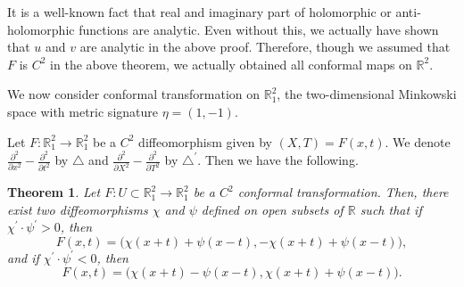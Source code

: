 \documentclass[a4paper,10pt]{amsart}
\theoremstyle{plain}
\newtheorem{thm}{Theorem}[section]
\newtheorem*{main theorem}{Theorem}
\theoremstyle{definition}
\begin{document}
It is a well-known fact that real and imaginary part of
holomorphic or anti-holomorphic functions are analytic. Even
without this, we actually have shown that $u$ and $v$ are analytic
in the above proof. Therefore, though we assumed that $F$ is $C^2$
in the above theorem, we actually obtained all conformal maps on
$\mathbb{R}^2$.

We now consider conformal transformation on $\mathbb{R}^2_1$, the
two-dimensional Minkowski space with metric signature $\eta = (1,
-1)$.

Let $F : \mathbb{R}^2_1 \rightarrow \mathbb{R}^2_1$ be a $C^2$
diffeomorphism given by $(X, T) = F(x, t)$. We denote
$\frac{\partial^2}{\partial x^2}- \frac{\partial^2}{\partial t^2}$
by $\triangle$ and $\frac{\partial^2}{\partial X^2} -
\frac{\partial^2}{\partial T^2}$ by $\triangle^\prime$. Then we
have the following.


\begin{thm} \label{final-2}
Let $F : U \subset \mathbb{R}^2_1 \rightarrow \mathbb{R}^2_1$ be a
$C^2$ conformal transformation. Then, there exist two
diffeomorphisms $\chi$ and $\psi$ defined on open subsets of
$\mathbb{R}$ such that if $\chi^\prime \cdot \psi^\prime > 0 $,
then  $$ F(x,t) = \Big( \chi(x+t) + \psi(x-t), -\chi(x+t) +
\psi(x-t) \Big), $$ and if $\chi^\prime \cdot \psi^\prime < 0$,
then $$F(x,t) = \Big( \chi(x+t)-\psi(x-t), \chi(x+t) + \psi(x-t)
\Big).$$
\end{thm}
\end{document}
